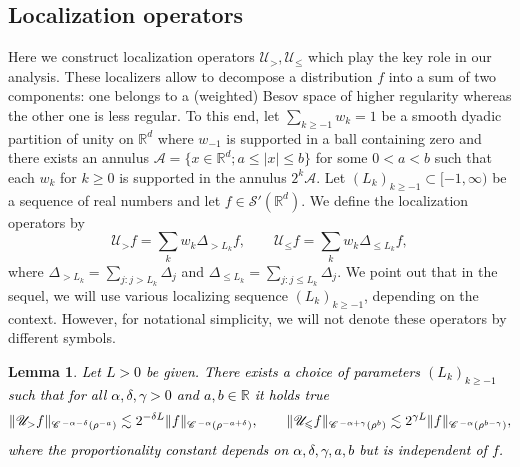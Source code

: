 \documentclass[a4paper,11pt]{article}
\renewcommand{\leq}{\leqslant}
\renewcommand{\geq}{\geqslant}
\newtheorem{lemma}[theorem]{Lemma}
\numberwithin{equation}{section}
\newcommand{\CC}{\mathscr{C} \hspace{.1em}}
\newcommand{\UU}{\mathscr{U}}
\newcommand{\rmbb}[1]{\textcolor{black}{#1}}
\newcommand{\R}{\mathbb{R}}
\newcommand{\8}{\infty}
\begin{document}
\subsection{Localization operators}
\label{ssec:local}



Here we construct localization operators $\UU_{>},
\UU_{\leqslant}$ which play the key role in our analysis. These localizers allow to decompose  a distribution $f$ into a sum of two components: one belongs to a (weighted) Besov space of higher regularity whereas the other one is less regular. To this end, let  $\sum_{k\geq-1} w_k = 1$ be a smooth dyadic  partition of unity on $\R^{d}$
where $w_{-1}$ is supported in a ball containing zero and there exists an annulus $\mathcal{A}=\{x\in\R^{d};a\leq|x|\leq b\}$ for some $0<a<b$ such that each $w_k$ for $k\geq0$ is supported in the annulus $2^k\mathcal{A}$.
%
Let $(L_{k})_{k\geq -1}\subset [-1,\infty)$ be a sequence of real numbers and let $f\in\mathcal{S}'(\R^{d})$. We define the localization operators by
\[ \UU_{>} f = \sum_k w_k \Delta_{> L_k} f, \qquad
   \UU_{\leqslant} f = \sum_k w_k \Delta_{\leqslant L_k} f, \]
where $\Delta_{>L_{k}}=\sum_{j:j>L_{k}}\Delta_{j}$ and $\Delta_{\leq L_{k}}=\sum_{j:j\leq L_{k}}\Delta_{j}$. We point out that in the sequel, we will use various localizing sequence $(L_{k})_{k\geq -1}$, depending on the context. However, for notational simplicity, we
will not denote these operators by different symbols.


\begin{lemma}\label{lem:local}
\rmbb{Let $L>0$ be given. There exists a  choice of parameters $(L_k)_{k\geq -1}$ such that for all $\alpha,\delta,\gamma>0$ and $a,b\in\R$ it holds true
      \[ \| \UU_{>} f \|_{\CC^{-\alpha - \delta} (\rho^{- a})} \lesssim 2^{- \delta L} \| f \|_{\CC^{-\alpha}
     (\rho^{-a+\delta})}, \qquad \| \UU_{\leqslant} f \|_{\CC^{-\alpha+\gamma}
     (\rho^{b})} \lesssim 2^{\gamma	
     L} \| f \|_{\CC^{-\alpha} (\rho^{b-\gamma})}, \]
          where the proportionality constant depends on $\alpha,\delta,\gamma,a,b$ but is independent of $f$.}
\end{lemma}
\end{document}
